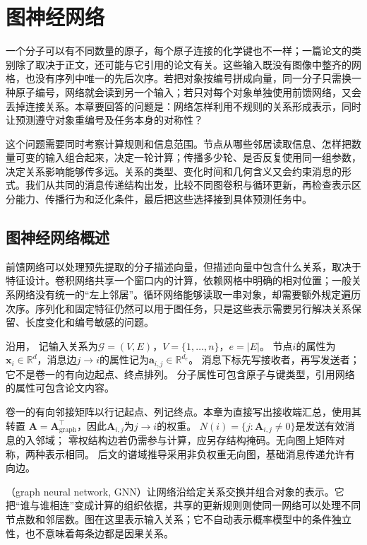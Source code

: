 \chapter{图神经网络}
\label{chap:graph-networks}

一个分子可以有不同数量的原子，每个原子连接的化学键也不一样；一篇论文的类别除了取决于正文，还可能与它引用的论文有关。这些输入既没有图像中整齐的网格，也没有序列中唯一的先后次序。若把对象按编号拼成向量，同一分子只需换一种原子编号，网络就会读到另一个输入；若只对每个对象单独使用前馈网络，又会丢掉连接关系。本章要回答的问题是：网络怎样利用不规则的关系形成表示，同时让预测遵守对象重编号及任务本身的对称性？

这个问题需要同时考察计算规则和信息范围。节点从哪些邻居读取信息、怎样把数量可变的输入组合起来，决定一轮计算；传播多少轮、是否反复使用同一组参数，决定关系影响能够传多远。关系的类型、变化时间和几何含义又会约束消息的形式。我们从共同的消息传递结构出发，比较不同图卷积与循环更新，再检查表示区分能力、传播行为和泛化条件，最后把这些选择接到具体预测任务中。

\section{图神经网络概述}
\label{sec:gnn-overview}

前馈网络可以处理预先提取的分子描述向量，但描述向量中包含什么关系，取决于特征设计。卷积网络共享一个窗口内的计算，依赖网格中明确的相对位置；一般关系网络没有统一的“左上邻居”。循环网络能够读取一串对象，却需要额外规定遍历次序。序列化和固定特征仍然可以用于图任务，只是这些表示需要另行解决关系保留、长度变化和编号敏感的问题。

沿用，
记输入关系为$\mathcal G=(V,E)$，$V=\{1,\ldots,n\}$，$e=|E|$。
节点$i$的属性为$\bm x_i\in\mathbb R^d$，消息边$j\to i$的属性记为$\bm a_{i,j}\in\mathbb R^{d_e}$。
消息下标先写接收者，再写发送者；它不是卷一的有向边起点、终点排列。
分子属性可包含原子与键类型，引用网络的属性可包含论文内容。

卷一的有向邻接矩阵以行记起点、列记终点。本章为直接写出接收端汇总，使用其转置
$\bm A=\bm A_{\mathrm{graph}}^\top$，因此$\bm A_{i,j}$为$j\to i$的权重。
$N(i)=\{j:\bm A_{i,j}\ne0\}$是发送有效消息的入邻域；
零权结构边若仍需参与计算，应另存结构掩码。无向图上矩阵对称，两种表示相同。
后文的谱域推导采用非负权重无向图，基础消息传递允许有向边。

（graph neural network, GNN）让网络沿给定关系交换并组合对象的表示。它把“谁与谁相连”变成计算的组织依据，共享的更新规则则使同一网络可以处理不同节点数和邻居数。图在这里表示输入关系；它不自动表示概率模型中的条件独立性，也不意味着每条边都是因果关系。

